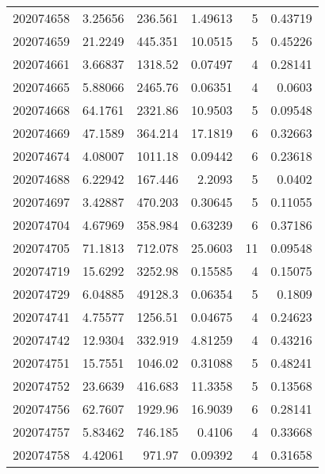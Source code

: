 \begin{tabular}{rrrrrr}
 202074658 &          3.25656 &      236.561  &            1.49613 &           5 & 0.43719 \\
 202074659 &         21.2249  &      445.351  &           10.0515  &           5 & 0.45226 \\
 202074661 &          3.66837 &     1318.52   &            0.07497 &           4 & 0.28141 \\
 202074665 &          5.88066 &     2465.76   &            0.06351 &           4 & 0.0603  \\
 202074668 &         64.1761  &     2321.86   &           10.9503  &           5 & 0.09548 \\
 202074669 &         47.1589  &      364.214  &           17.1819  &           6 & 0.32663 \\
 202074674 &          4.08007 &     1011.18   &            0.09442 &           6 & 0.23618 \\
 202074688 &          6.22942 &      167.446  &            2.2093  &           5 & 0.0402  \\
 202074697 &          3.42887 &      470.203  &            0.30645 &           5 & 0.11055 \\
 202074704 &          4.67969 &      358.984  &            0.63239 &           6 & 0.37186 \\
 202074705 &         71.1813  &      712.078  &           25.0603  &          11 & 0.09548 \\
 202074719 &         15.6292  &     3252.98   &            0.15585 &           4 & 0.15075 \\
 202074729 &          6.04885 &    49128.3    &            0.06354 &           5 & 0.1809  \\
 202074741 &          4.75577 &     1256.51   &            0.04675 &           4 & 0.24623 \\
 202074742 &         12.9304  &      332.919  &            4.81259 &           4 & 0.43216 \\
 202074751 &         15.7551  &     1046.02   &            0.31088 &           5 & 0.48241 \\
 202074752 &         23.6639  &      416.683  &           11.3358  &           5 & 0.13568 \\
 202074756 &         62.7607  &     1929.96   &           16.9039  &           6 & 0.28141 \\
 202074757 &          5.83462 &      746.185  &            0.4106  &           4 & 0.33668 \\
 202074758 &          4.42061 &      971.97   &            0.09392 &           4 & 0.31658 \\

\end{tabular}

